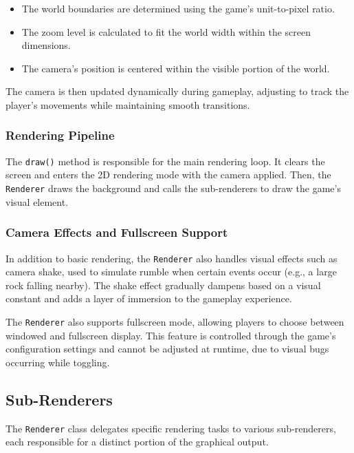     \begin{itemize}
        \item The world boundaries are determined using the game's unit-to-pixel ratio.
        \item The zoom level is calculated to fit the world width within the screen dimensions.
        \item The camera's position is centered within the visible portion of the world.
    \end{itemize}

    The camera is then updated dynamically during gameplay, adjusting to track the player's movements while maintaining smooth transitions.

  \subsubsection{Rendering Pipeline}

    The \texttt{draw()} method is responsible for the main rendering loop. It clears the screen and enters the 2D rendering mode with the camera applied.
    Then, the \texttt{Renderer} draws the background and calls the sub-renderers to draw the game's visual element.

  \subsubsection{Camera Effects and Fullscreen Support}

    In addition to basic rendering, the \texttt{Renderer} also handles visual effects such as camera shake, used to simulate rumble when certain events occur (e.g., a large rock falling nearby). The shake effect gradually dampens based on a visual constant and adds a layer of immersion to the gameplay experience.

    The \texttt{Renderer} also supports fullscreen mode, allowing players to choose between windowed and fullscreen display. 
    This feature is controlled through the game's configuration settings and cannot be adjusted at runtime, due to visual bugs occurring while toggling.

  \subsection{Sub-Renderers}

    The \texttt{Renderer} class delegates specific rendering tasks to various sub-renderers, each responsible for a distinct portion of the graphical output.

